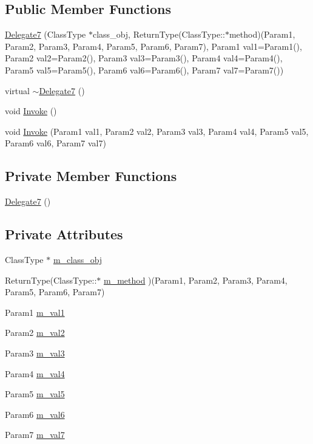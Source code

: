 \subsection*{Public Member Functions}
\begin{CompactItemize}
\item 
\hyperlink{classDL_1_1Delegate7_a0}{Delegate7} (Class\-Type $\ast$class\_\-obj, Return\-Type(Class\-Type::$\ast$method)(Param1, Param2, Param3, Param4, Param5, Param6, Param7), Param1 val1=Param1(), Param2 val2=Param2(), Param3 val3=Param3(), Param4 val4=Param4(), Param5 val5=Param5(), Param6 val6=Param6(), Param7 val7=Param7())
\item 
virtual \hyperlink{classDL_1_1Delegate7_a1}{$\sim$Delegate7} ()
\item 
void \hyperlink{classDL_1_1Delegate7_a2}{Invoke} ()
\item 
void \hyperlink{classDL_1_1Delegate7_a3}{Invoke} (Param1 val1, Param2 val2, Param3 val3, Param4 val4, Param5 val5, Param6 val6, Param7 val7)
\end{CompactItemize}
\subsection*{Private Member Functions}
\begin{CompactItemize}
\item 
\hyperlink{classDL_1_1Delegate7_d0}{Delegate7} ()
\end{CompactItemize}
\subsection*{Private Attributes}
\begin{CompactItemize}
\item 
Class\-Type $\ast$ \hyperlink{classDL_1_1Delegate7_r0}{m\_\-class\_\-obj}
\item 
Return\-Type(Class\-Type::$\ast$ \hyperlink{classDL_1_1Delegate7_r1}{m\_\-method} )(Param1, Param2, Param3, Param4, Param5, Param6, Param7)
\item 
Param1 \hyperlink{classDL_1_1Delegate7_r2}{m\_\-val1}
\item 
Param2 \hyperlink{classDL_1_1Delegate7_r3}{m\_\-val2}
\item 
Param3 \hyperlink{classDL_1_1Delegate7_r4}{m\_\-val3}
\item 
Param4 \hyperlink{classDL_1_1Delegate7_r5}{m\_\-val4}
\item 
Param5 \hyperlink{classDL_1_1Delegate7_r6}{m\_\-val5}
\item 
Param6 \hyperlink{classDL_1_1Delegate7_r7}{m\_\-val6}
\item 
Param7 \hyperlink{classDL_1_1Delegate7_r8}{m\_\-val7}
\end{CompactItemize}


